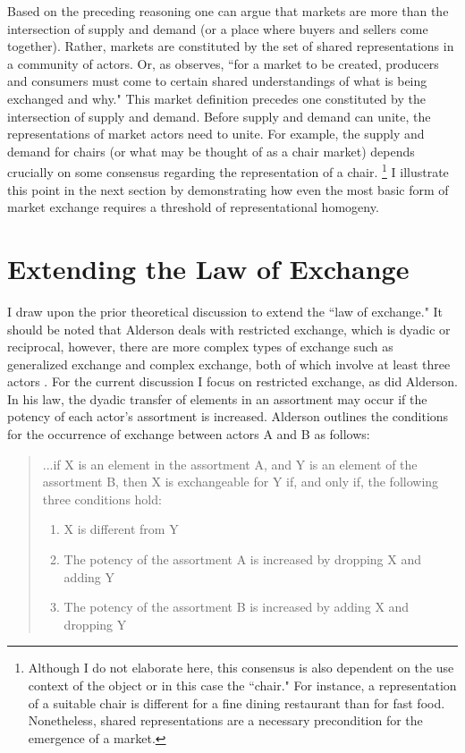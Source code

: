 Based on the preceding reasoning one can argue that markets are more than the intersection of supply and demand (or a place where buyers and sellers come together).  Rather, markets are constituted by the set of shared representations in a community of actors. Or, as \citet{humphreys2010} observes, ``for a market to be created, producers and consumers must come to certain shared understandings of what is being exchanged and why." This market definition precedes one constituted by the intersection of supply and demand. Before supply and demand can unite, the representations of market actors need to unite. For example, the supply and demand for chairs (or what may be thought of as a chair market) depends crucially on some consensus regarding the representation of a chair. \footnote{Although I do not elaborate here, this consensus is also dependent on the use context of the object or in this case the ``chair." For instance, a representation of a suitable chair is different for a fine dining restaurant than for fast food. Nonetheless, shared representations are a necessary precondition for the emergence of a market.} I illustrate this point in the next section by demonstrating how even the most basic form of market exchange requires a threshold of representational homogeny. 

\section{Extending the Law of Exchange}
I draw upon the prior theoretical discussion to extend the \citet[p. 84]{alderson1965a} ``law of exchange." It should be noted that Alderson deals with restricted exchange, which is dyadic or reciprocal, however, there are more complex types of exchange such as generalized exchange and complex exchange, both of which involve at least three actors \citep{bagozzi1975}. For the current discussion I focus on restricted exchange, as did Alderson.  In his law, the dyadic transfer of elements in an assortment may occur if the potency of each actor's assortment is increased. Alderson outlines the conditions for the occurrence of exchange between actors A and B as follows:

\begin{footnotesize}
\begin{quote}
...if X is an element in the assortment A, and Y is an element of the assortment B, then X is exchangeable for Y if, and only if, the following three conditions hold:
\begin{enumerate}
  \item X is different from Y
  \item The potency of the assortment A is increased by dropping X and adding Y
  \item The potency of the assortment B is increased by adding X and dropping Y
\end{enumerate}
\end{quote}
\end{footnotesize}

